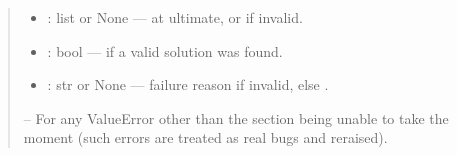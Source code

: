 \documentclass[a4paper,11pt,german]{sphinxmanual}
\begin{document}
\begin{fulllineitems}
\begin{quote}
\begin{description}
\begin{itemize}
\item {} 
\sphinxAtStartPar
{} : list or None —  at
ultimate, or  if invalid.

\item {} 
\sphinxAtStartPar
{} : bool —  if a valid solution was found.

\item {} 
\sphinxAtStartPar
{} : str or None — failure reason if invalid, else .

\end{itemize}


\sphinxAtStartPar
{}

\sphinxAtStartPar
{} – For any ValueError other than the section being unable to take the
    moment (such errors are treated as real bugs and re\sphinxhyphen{}raised).

\end{description}\end{quote}

\end{fulllineitems}

\end{document}

